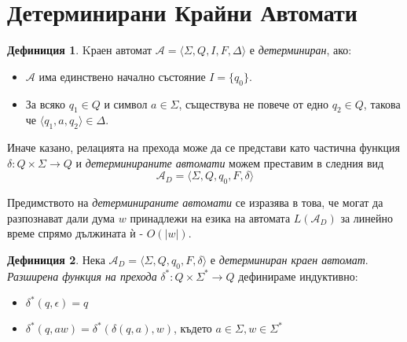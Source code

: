 \documentclass[12pt, oneside]{article}
\theoremstyle{definition}
\newtheorem{definition}{Дефиниция}[section]
\begin{document}
\section{Детерминирани Крайни Автомати}

\begin{definition}
	Kраен автомат \( \mathcal{A} = \langle \Sigma, Q, I, F, \Delta \rangle \) е \emph{детерминиран}, ако:

	\begin{itemize}
		\item \( \mathcal{A} \) има единствено начално състояние \(I = \{q_0\}\).
		\item За всяко \( q_1 \in Q \) и символ \( a \in \Sigma \), съществува не повече от едно \( q_2 \in Q \), такова че \( \langle q_1, a, q_2 \rangle \in \Delta \).
	\end{itemize} 

	\noindent Иначе казано, релацията на прехода може да се представи като частична функция \( \delta: Q \times \Sigma \to Q \) и \emph{детерминираните автомати} можем преставим в следния вид \[ \mathcal{A}_D = \langle \Sigma, Q, q_0, F, \delta \rangle \]

	Предимството на \emph{детерминираните автомати} се изразява в това, че могат да разпознават дали дума \( w \) принадлежи на езика на автомата \( L(\mathcal{A}_D) \) за линейно време спрямо дължината ѝ - \( O(|w|) \).
\end{definition}

\begin{definition}
	Нека \( \mathcal{A}_D = \langle \Sigma, Q, q_0, F, \delta \rangle \) е \emph{детерминиран краен автомат}. \emph{Разширена функция на прехода} \( \delta^*: Q \times \Sigma^* \to Q \) дефинираме индуктивно:

	\begin{itemize}
		\item \( \delta^*(q, \epsilon) = q \)
		\item \( \delta^*(q, aw) = \delta^*(\delta(q, a), w) \), където \( a \in \Sigma, w \in \Sigma^* \)
	\end{itemize}
\end{definition}
\end{document}
